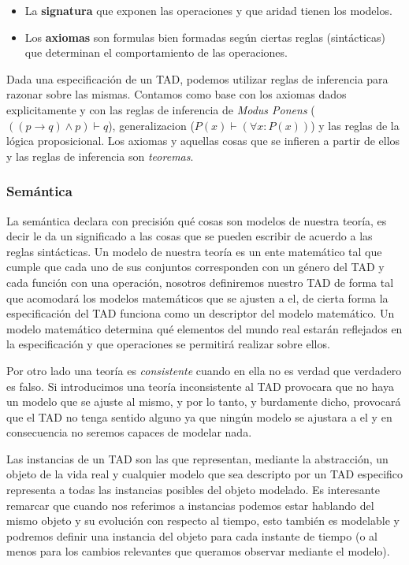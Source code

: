 \begin{itemize}
 \item La \textbf{signatura} que exponen las operaciones y que aridad tienen los modelos.
 \item Los \textbf{axiomas} son formulas bien formadas seg\'un ciertas reglas (sint\'acticas) que determinan el comportamiento de las operaciones.
\end{itemize}

Dada una especificaci\'on de un TAD, podemos utilizar reglas de inferencia para razonar sobre las mismas. Contamos como base con los axiomas dados explicitamente y con las reglas de inferencia de \textit{Modus Ponens} ($((p \rightarrow q) \wedge p) \vdash q $), generalizacion ($P(x) \vdash (\forall x: P(x)) $) y las reglas de la l\'ogica proposicional. Los axiomas y aquellas cosas que se infieren a partir de ellos y las reglas de inferencia son \textit{teoremas}.

\subsubsection*{Sem\'antica}

La sem\'antica declara con precisi\'on qu\'e cosas son modelos de nuestra teor\'ia, es decir le da un significado a las cosas que se pueden escribir de acuerdo a las reglas sint\'acticas. Un modelo de nuestra teor\'ia es un ente matem\'atico tal que cumple que cada uno de sus conjuntos corresponden con un g\'enero del TAD y cada funci\'on con una operaci\'on, nosotros definiremos nuestro TAD de forma tal que acomodar\'a los modelos matem\'aticos que se ajusten a el, de cierta forma la especificaci\'on del TAD funciona como un descriptor del modelo matem\'atico. Un modelo matem\'atico determina qu\'e elementos del mundo real estar\'an reflejados en la especificaci\'on y que operaciones se permitir\'a realizar sobre ellos.

Por otro lado una teor\'ia es \textit{consistente} cuando en ella no es verdad que verdadero es falso. Si introducimos una teor\'ia inconsistente al TAD provocara que no haya un modelo que se ajuste al mismo, y por lo tanto, y burdamente dicho, provocar\'a que el TAD no tenga sentido alguno ya que ning\'un modelo se ajustara a el y en consecuencia no seremos capaces de modelar nada.

Las instancias de un TAD son las que representan, mediante la abstracci\'on, un objeto de la vida real y cualquier modelo que sea descripto por un TAD especifico representa a todas las instancias posibles del objeto modelado. Es interesante remarcar que cuando nos referimos a instancias podemos estar hablando del mismo objeto y su evoluci\'on con respecto al tiempo, esto tambi\'en es modelable y podremos definir una instancia del objeto para cada instante de tiempo (o al menos para los cambios relevantes que queramos observar mediante el modelo).

